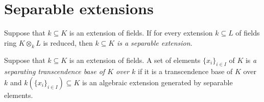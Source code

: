 \section{Separable extensions}

\begin{definition}
Suppose that $k\subseteq K$ is an extension of fields. If for every extension $k\subseteq L$ of fields ring $K\otimes_kL$ is reduced, then $k\subseteq K$ \textit{is a separable extension}.
\end{definition}

\begin{definition}
Suppose that $k\subseteq K$ is an extension of fields. A set of elements $\{x_i\}_{i\in I}$ of $K$ is \textit{a separating transcendence base of $K$ over $k$} if it is a transcendence base of $K$ over $k$ and $k(\{x_i\}_{ i\in I})\subseteq K$ is an algebraic extension generated by separable elements.
\end{definition}

